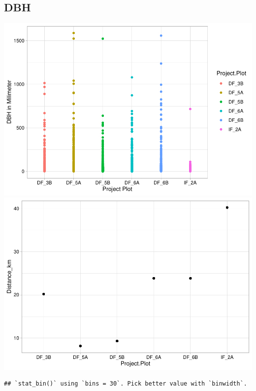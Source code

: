 \documentclass[
  12pt,
]{article}
\begin{document}
\hypertarget{dbh}{%
\subsection{DBH}\label{dbh}}

\includegraphics{GoldenGriffithsKnierMalinowski_ENV872_Project_files/figure-latex/DBH graphs-1.pdf}
\includegraphics{GoldenGriffithsKnierMalinowski_ENV872_Project_files/figure-latex/DBH graphs-2.pdf}

\begin{verbatim}
## `stat_bin()` using `bins = 30`. Pick better value with `binwidth`.
\end{verbatim}
\end{document}
